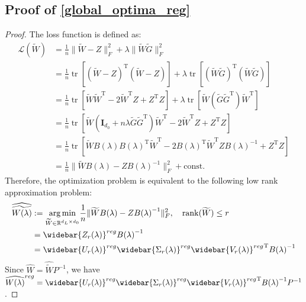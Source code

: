 \documentclass{article}
\newcommand{\T}{\mathrm{T}}
\theoremstyle{plain}
\theoremstyle{definition}
\theoremstyle{remark}
\theoremstyle{remark}
\begin{document}
\subsection{Proof of \autoref{global_optima_reg}}
\globaloptimareg*
\begin{proof}
  The loss function is defined as: 
  \begin{align}
    \mathcal{L}(\widetilde{W}) &=  \frac{1}{n} \|\widetilde{W}-Z\|_F^2+\lambda \|\widetilde{W}\widetilde{G}\|_F^2 \\
    &=  \frac{1}{n} \operatorname*{tr}[(\widetilde{W}-Z)^{\T} (\widetilde{W}-Z)] + \lambda \operatorname*{tr}[(\widetilde{W}\widetilde{G})^{\T}(\widetilde{W}\widetilde{G})] \nonumber \\ 
    &= \frac{1}{n} \operatorname*{tr}[\widetilde{W}\widetilde{W}^{\T} - 2\widetilde{W}^{\T}Z + Z^{\T}Z] + \lambda \operatorname*{tr}[\widetilde{W}(\widetilde{G}\widetilde{G}^{\T})\widetilde{W}^{\T}] \nonumber \\
    &= \frac{1}{n} \operatorname*{tr}[\widetilde{W}(\mathbf{I}_{d_0}+n\lambda \widetilde{G}\widetilde{G}^{\T})\widetilde{W}^{\T} - 2\widetilde{W}^{\T}Z + Z^{\T}Z] \nonumber \\
    &= \frac{1}{n} \operatorname*{tr}[\widetilde{W}B(\lambda)B(\lambda)^{\T}\widetilde{W}^{\T} - 2B(\lambda)^{\T}\widetilde{W}^{\T}ZB(\lambda)^{-1} + Z^{\T}Z] \nonumber \\
    &= \frac{1}{n} \|\widetilde{W}B(\lambda)-ZB(\lambda)^{-1}\|_F^2+ \text{const}.
  \end{align}
  Therefore, the optimization problem is equivalent to the following low rank approximation problem:
  \begin{align}
    \widehat{\widetilde{W(\lambda)}} &:=\underset{\widetilde{W} \in \mathbb{R}^{d_L \times d_0}}{\arg\min} \frac{1}{n} \|\widetilde{W}B(\lambda)-Z{B(\lambda)}^{-1}\|_F^2, \quad  \operatorname*{rank}(\widetilde{W}) \leq r  \\
    &= \widebar{Z_r(\lambda)}^{reg} {B(\lambda)}^{-1} \\
    &= \widebar{U_r(\lambda)}^{reg} \widebar{\Sigma_r(\lambda)}^{reg} {\widebar{V_r(\lambda)}^{reg}}^{\T} {B(\lambda)}^{-1}
  \end{align}
  Since $  \widehat{W} = \widehat{\widetilde{W}}P^{-1}$, we have $\widehat{W(\lambda)}^{reg} = \widebar{U_r(\lambda)}^{reg} \widebar{\Sigma_r(\lambda)}^{reg} {\widebar{V_r(\lambda)}^{reg}}^{\T} {B(\lambda)}^{-1} P^{-1}$.
\end{proof}
\end{document}
